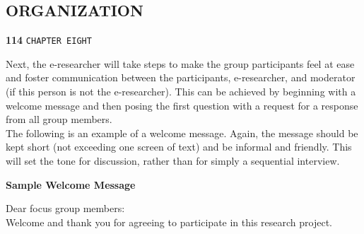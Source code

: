 \documentclass[a4,9pt]{beamer}
\begin{document}
\begin{frame}
\section*{ORGANIZATION}
\begin{flushleft}
\hspace*{-0.5cm} \textbf{114}\hspace*{1cm} \texttt{CHAPTER EIGHT}
\end{flushleft}

\vspace*{0.5cm}
Next, the e-researcher will take steps to make the group participants feel at ease and foster communication between the participants, e-researcher, and moderator (if this person is not the e-researcher). This can be achieved by beginning with a welcome message and then posing the first question with a request for a response from all group members.\\
\hspace*{0.7cm} The following is an example of a welcome message. Again, the message should be kept short (not exceeding one screen of text) and be informal and friendly. This will set the tone for discussion, rather than for simply a sequential interview.\\

\vspace*{0.3cm}
\begin{center}
  \textbf{Sample Welcome Message}\\
\end{center}
\vspace*{0.3cm}

\hspace*{0.7cm} Dear focus group members:\\

\vspace*{0.3cm}
\hspace*{0.7cm} Welcome and thank you for agreeing to participate in this research project.\\

\vspace*{0.3cm}
\end{frame}
\end{document}
